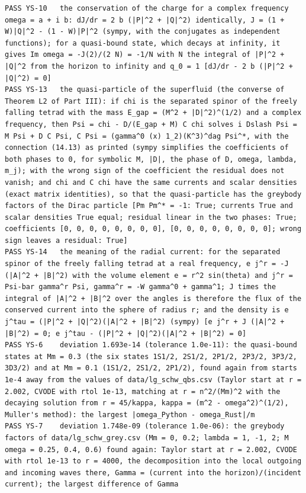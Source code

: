 \documentclass[
  10pt,
]{article}
\begin{document}
\begin{verbatim}
PASS YS-10   the conservation of the charge for a complex frequency omega = a + i b: dJ/dr = 2 b (|P|^2 + |Q|^2) identically, J = (1 + W)|Q|^2 - (1 - W)|P|^2 (sympy, with the conjugates as independent functions); for a quasi-bound state, which decays at infinity, it gives Im omega = -J(2)/(2 N) = -1/N with N the integral of |P|^2 + |Q|^2 from the horizon to infinity and q_0 = 1 [dJ/dr - 2 b (|P|^2 + |Q|^2) = 0]
PASS YS-13   the quasi-particle of the superfluid (the converse of Theorem L2 of Part III): if chi is the separated spinor of the freely falling tetrad with the mass E_gap = (M^2 + |D|^2)^(1/2) and a complex frequency, then Psi = chi - D/(E_gap + M) C chi solves i Dslash Psi = M Psi + D C Psi, C Psi = (gamma^0 (x) 1_2)(K^3)^dag Psi^*, with the connection (14.13) as printed (sympy simplifies the coefficients of both phases to 0, for symbolic M, |D|, the phase of D, omega, lambda, m_j); with the wrong sign of the coefficient the residual does not vanish; and chi and C chi have the same currents and scalar densities (exact matrix identities), so that the quasi-particle has the greybody factors of the Dirac particle [Pm Pm^* = -1: True; currents True and scalar densities True equal; residual linear in the two phases: True; coefficients [0, 0, 0, 0, 0, 0, 0, 0], [0, 0, 0, 0, 0, 0, 0, 0]; wrong sign leaves a residual: True]
PASS YS-14   the meaning of the radial current: for the separated spinor of the freely falling tetrad at a real frequency, e j^r = -J (|A|^2 + |B|^2) with the volume element e = r^2 sin(theta) and j^r = Psi-bar gamma^r Psi, gamma^r = -W gamma^0 + gamma^1; J times the integral of |A|^2 + |B|^2 over the angles is therefore the flux of the conserved current into the sphere of radius r; and the density is e j^tau = (|P|^2 + |Q|^2)(|A|^2 + |B|^2) (sympy) [e j^r + J (|A|^2 + |B|^2) = 0; e j^tau - (|P|^2 + |Q|^2)(|A|^2 + |B|^2) = 0]
PASS YS-6    deviation 1.693e-14 (tolerance 1.0e-11): the quasi-bound states at Mm = 0.3 (the six states 1S1/2, 2S1/2, 2P1/2, 2P3/2, 3P3/2, 3D3/2) and at Mm = 0.1 (1S1/2, 2S1/2, 2P1/2), found again from starts 1e-4 away from the values of data/lg_schw_qbs.csv (Taylor start at r = 2.002, CVODE with rtol 1e-13, matching at r = n^2/(Mm)^2 with the decaying solution from r = 45/kappa, kappa = (m^2 - omega^2)^(1/2), Muller's method): the largest |omega_Python - omega_Rust|/m
PASS YS-7    deviation 1.748e-09 (tolerance 1.0e-06): the greybody factors of data/lg_schw_grey.csv (Mm = 0, 0.2; lambda = 1, -1, 2; M omega = 0.25, 0.4, 0.6) found again: Taylor start at r = 2.002, CVODE with rtol 1e-13 to r = 4000, the decomposition into the local outgoing and incoming waves there, Gamma = (current into the horizon)/(incident current); the largest difference of Gamma

\end{verbatim}
\end{document}
